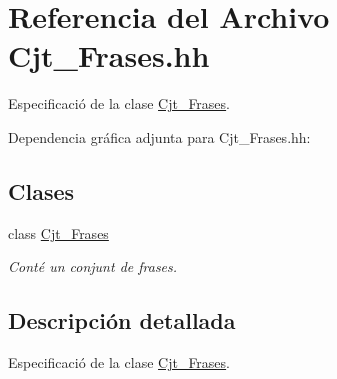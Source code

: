 \hypertarget{_cjt___frases_8hh}{}\section{Referencia del Archivo Cjt\+\_\+\+Frases.\+hh}
\label{_cjt___frases_8hh}


Especificació de la clase \hyperlink{class_cjt___frases}{Cjt\+\_\+\+Frases}.  


Dependencia gráfica adjunta para Cjt\+\_\+\+Frases.\+hh\+:
\subsection*{Clases}
\begin{DoxyCompactItemize}
\item 
class \hyperlink{class_cjt___frases}{Cjt\+\_\+\+Frases}
\begin{DoxyCompactList}\small\item\em Conté un conjunt de frases. \end{DoxyCompactList}\end{DoxyCompactItemize}


\subsection{Descripción detallada}
Especificació de la clase \hyperlink{class_cjt___frases}{Cjt\+\_\+\+Frases}. 

